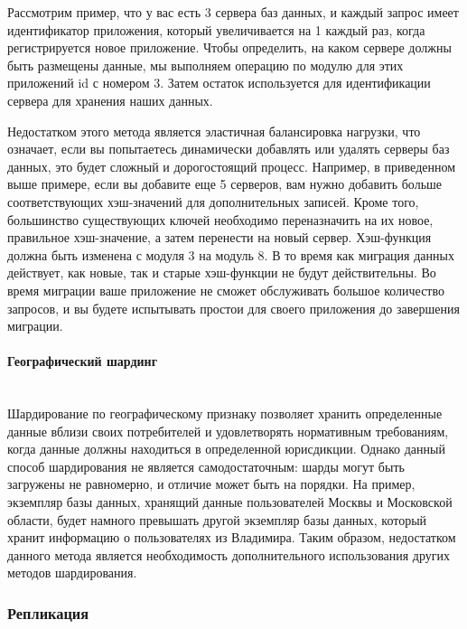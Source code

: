 Рассмотрим пример, что у вас есть 3 сервера баз данных, и каждый запрос имеет идентификатор приложения, который
увеличивается на 1 каждый раз, когда регистрируется новое приложение. Чтобы определить, на каком сервере должны быть
размещены данные, мы выполняем операцию по модулю для этих приложений id с номером 3. Затем остаток используется для
идентификации сервера для хранения наших данных.

Недостатком этого метода является эластичная балансировка нагрузки, что означает, если вы попытаетесь динамически
добавлять или удалять серверы баз данных, это будет сложный и дорогостоящий процесс. Например, в приведенном выше
примере, если вы добавите еще 5 серверов, вам нужно добавить больше соответствующих хэш-значений для дополнительных
записей. Кроме того, большинство существующих ключей необходимо переназначить на их новое, правильное хэш-значение,
а затем перенести на новый сервер. Хэш-функция должна быть изменена с модуля 3 на модуль 8. В то время как миграция
данных действует, как новые, так и старые хэш-функции не будут действительны. Во время миграции ваше приложение не
сможет обслуживать большое количество запросов, и вы будете испытывать простои для своего приложения до завершения
миграции. \autocite{DatabaseSharding}

\paragraph{Географический шардинг} ~\\
Шардирование по географическому признаку позволяет хранить определенные данные вблизи своих потребителей и
удовлетворять нормативным требованиям, когда данные должны находиться в определенной юрисдикции. Однако данный способ
шардирования не является самодостаточным: шарды могут быть загружены не равномерно, и отличие может быть на порядки.
На пример, экземпляр базы данных, хранящий данные пользователей Москвы и Московской области, будет намного превышать
другой экземпляр базы данных, который хранит информацию о пользователях из Владимира. Таким образом, недостатком
данного метода является необходимость дополнительного использования других методов шардирования.

\subsubsection{Репликация} ~\\


